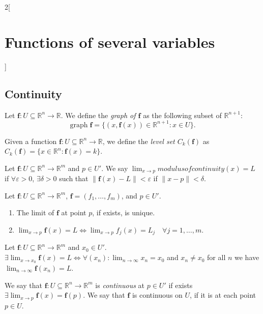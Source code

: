 \documentclass[class=article,10pt,crop=false]{standalone}
\begin{document}
\begin{multicols}{2}[\section{Functions of several variables}]
\subsection{Continuity}
\begin{definition}
Let $\boldsymbol{f}:U\subseteq\mathbb{R}^n\rightarrow\mathbb{R}$. We define the \textit{graph of $\boldsymbol{f}$} as the following subset of $\mathbb{R}^{n+1}$: $$\text{graph}\;\boldsymbol{f}=\{(x,\boldsymbol{f}(x))\in\mathbb{R}^{n+1}:x\in U\}.$$
\end{definition}
\begin{definition}
Given a function $\boldsymbol{f}:U\subseteq\mathbb{R}^n\rightarrow\mathbb{R}$, we define the \textit{level set $C_k(\boldsymbol{f})$} as $C_k(\boldsymbol{f})=\{x\in\mathbb{R}^n:\boldsymbol{f}(x)=k\}$.
\end{definition}
\begin{definition}
Let $\boldsymbol{\boldsymbol{f}}:U\subseteq\mathbb{R}^n\rightarrow\mathbb{R}^m$ and $p\in U'$. We say $\displaystyle\lim_{x\to p} modulus of continuity(x)=L$ if $\forall\varepsilon>0$, $\exists\delta>0$ such that $\|\mathbf{\boldsymbol{f}}(x)-L\|<\varepsilon$ if $\|x-p\|<\delta$.
\end{definition}
\begin{prop}
Let $\mathbf{\boldsymbol{f}}:U\subseteq\mathbb{R}^n\rightarrow\mathbb{R}^m$, $\mathbf{\boldsymbol{f}}=(f_1,\ldots,f_m)$, and $p\in U'$.
\begin{enumerate}
    \item The limit of $\mathbf{\boldsymbol{f}}$ at point $p$, if exists, is unique.
    \item $\displaystyle\lim_{x\to p}\mathbf{\boldsymbol{f}}(x)=L\iff\lim_{x\to p}f_j(x)=L_j\quad\forall j=1,\ldots,m$.
\end{enumerate}
\end{prop}
\begin{lemma}
Let $\mathbf{\boldsymbol{f}}:U\subseteq\mathbb{R}^n\rightarrow\mathbb{R}^m$ and $x_0\in U'$. $\displaystyle\exists\lim_{x\to x_0}\mathbf{\boldsymbol{f}}(x)=L\iff\forall(x_n):\lim_{n\to\infty}x_n=x_0$ and $x_n\ne x_0$ for all $n$ we have $\displaystyle\lim_{n\to \infty}\mathbf{\boldsymbol{f}}(x_n)=L$.
\end{lemma}
\begin{definition}
We say that $\mathbf{\boldsymbol{f}}:U\subseteq\mathbb{R}^n\rightarrow\mathbb{R}^m$ is \textit{continuous} at $p\in U'$ if exists $\displaystyle\exists\lim_{x\to p}\mathbf{\boldsymbol{f}}(x)=\mathbf{\boldsymbol{f}}(p)$. We say that $\mathbf{\boldsymbol{f}}$ is continuous on $U$, if it is at each point $p\in U$.

\end{definition}
\end{multicols}
\end{document}
